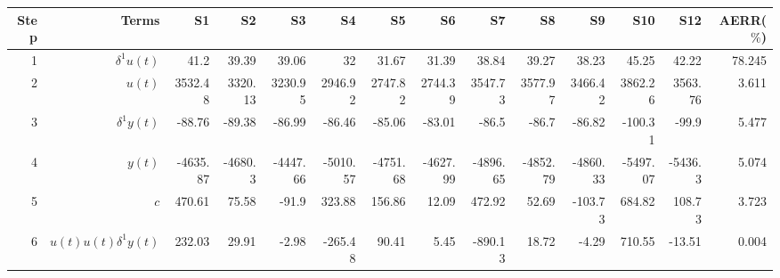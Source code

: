 \begin{tabular}{rrrrrrrrrrrrrr}
Step & Terms & S1 & S2 & S3 & S4 & S5 & S6 & S7 & S8 & S9 & S10 & S12 & AERR($\%$) \\ 
\hline 
1 & $\delta^1 u(t)$ & 41.2 & 39.39 & 39.06 & 32 & 31.67 & 31.39 & 38.84 & 39.27 & 38.23 & 45.25 & 42.22 & 78.245 \\ 
2 & $u(t)$ & 3532.48 & 3320.13 & 3230.95 & 2946.92 & 2747.82 & 2744.39 & 3547.73 & 3577.97 & 3466.42 & 3862.26 & 3563.76 & 3.611 \\ 
3 & $\delta^1 y(t)$ & -88.76 & -89.38 & -86.99 & -86.46 & -85.06 & -83.01 & -86.5 & -86.7 & -86.82 & -100.31 & -99.9 & 5.477 \\ 
4 & $y(t)$ & -4635.87 & -4680.3 & -4447.66 & -5010.57 & -4751.68 & -4627.99 & -4896.65 & -4852.79 & -4860.33 & -5497.07 & -5436.3 & 5.074 \\ 
5 & $c$ & 470.61 & 75.58 & -91.9 & 323.88 & 156.86 & 12.09 & 472.92 & 52.69 & -103.73 & 684.82 & 108.73 & 3.723 \\ 
6 & $u(t)u(t)\delta^1 y(t)$ & 232.03 & 29.91 & -2.98 & -265.48 & 90.41 & 5.45 & -890.13 & 18.72 & -4.29 & 710.55 & -13.51 & 0.004 \\ 
\hline 
\end{tabular}